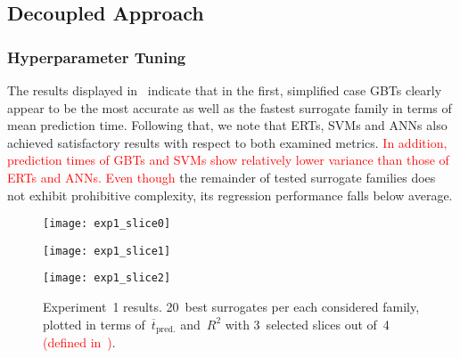 \subsection{Decoupled Approach}
\label{sec:modelres}

\subsubsection{Hyperparameter Tuning}
\label{sec:res-exp12}

The results displayed in~ indicate that in the first,
simplified case GBTs clearly appear to be the most accurate as well as the
fastest surrogate family in terms of mean prediction time. Following that, we
note that ERTs, SVMs and ANNs also achieved satisfactory results with respect to
both examined metrics. \textcolor{red}{In addition, prediction times of GBTs and SVMs show
relatively lower variance than those of ERTs and ANNs. Even though} the remainder
of tested surrogate families does not exhibit prohibitive complexity, its
regression performance falls below average.

\begin{figure}
	\centering
	\hspace*{-0.1\columnwidth}
	\texttt{[image: exp1\_slice0]}

	\vfill

	\hspace*{-0.1\columnwidth}
	\texttt{[image: exp1\_slice1]}

	\vfill

	\hspace*{-0.1\columnwidth}
	\texttt{[image: exp1\_slice2]}

	\caption{\label{fig:exp1-time-vs-reg}Experiment~1 results. 20~best surrogates per each considered family, plotted in
		terms of~$\overline{t}_{\text{pred.}}$ and~$R^2$ with 3~selected slices out
	of~4 \textcolor{red}{(defined in~)}.}
\end{figure}


